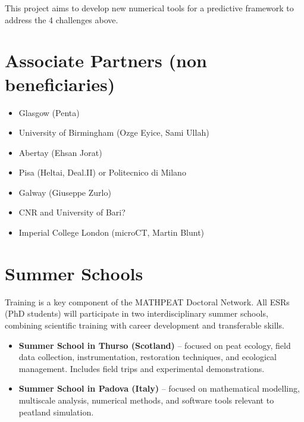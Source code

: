 \documentclass[12pt]{article}
\begin{document}
This project aims to develop new numerical tools for a predictive framework to address the 4 challenges above.

\section{Associate Partners (non beneficiaries)}
\begin{itemize}
    \item Glasgow (Penta)
    \item University of Birmingham (Ozge Eyice, Sami Ullah)
    \item Abertay (Ehsan Jorat)
    \item Pisa (Heltai, Deal.II) or Politecnico di Milano
    \item Galway (Giuseppe Zurlo)
    \item CNR and University of Bari?
    \item Imperial College London (microCT, Martin Blunt)
\end{itemize}

\section{Summer Schools}
Training is a key component of the MATHPEAT Doctoral Network. All ESRs (PhD students) will participate in two interdisciplinary summer schools, combining scientific training with career development and transferable skills.

\begin{itemize}
    \item \textbf{Summer School in Thurso (Scotland)} – focused on peat ecology, field data collection, instrumentation, restoration techniques, and ecological management. Includes field trips and experimental demonstrations.
    \item \textbf{Summer School in Padova (Italy)} – focused on mathematical modelling, multiscale analysis, numerical methods, and software tools relevant to peatland simulation.
\end{itemize}
\end{document}
